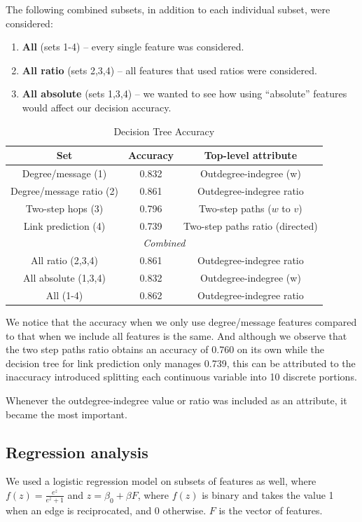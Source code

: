 \documentclass[conference]{IEEEtran}
\begin{document}
The following combined subsets, in addition to each individual subset, were considered:
\begin{enumerate}
	\item {\bf All} (sets 1-4) -- every single feature was considered.
	\item {\bf All ratio} (sets 2,3,4) -- all features that used ratios were considered.
	\item {\bf All absolute} (sets 1,3,4) -- we wanted to see how using ``absolute'' features would affect our decision accuracy.
\end{enumerate}
\begin{table}[!t]
\renewcommand{\arraystretch}{1.3}
\caption{Decision Tree Accuracy}
\label{table_recresults_dtree}
\centering
\begin{tabular}{|c||c|c|}
\hline
\bf{Set} & Accuracy & Top-level attribute \\
\hline
Degree/message (1) & 0.832 & Outdegree-indegree (w) \\
Degree/message ratio (2) & 0.861 & Outdegree-indegree ratio \\
Two-step hops (3) & 0.796 & Two-step paths ($w$ to $v$) \\
Link prediction (4) & 0.739 & Two-step paths ratio (directed) \\
\hline
\multicolumn{3}{|c|}{\emph{Combined}} \\
\hline
All ratio (2,3,4) & 0.861 & Outdegree-indegree ratio \\
All absolute (1,3,4) & 0.832 & Outdegree-indegree (w) \\
All (1-4) & 0.862 & Outdegree-indegree ratio \\
\hline
\end{tabular}
\end{table}

We notice that the accuracy when we only use degree/message features compared to that when we include all features is the same. And although we observe that the two step paths ratio obtains an accuracy of 0.760 on its own while the decision tree for link prediction only manages 0.739, this can be attributed to the inaccuracy introduced splitting each continuous variable into 10 discrete portions.

Whenever the outdegree-indegree value or ratio was included as an attribute, it became the most important.

\subsection{Regression analysis}
We used a logistic regression model on subsets of features as well, where $f(z) = \frac{e^z}{e^z+1}$ and $z = \beta_0 + \beta F$, where $f(z)$ is binary and takes the value 1 when an edge is reciprocated, and 0 otherwise. $F$ is the vector of features.
\end{document}
